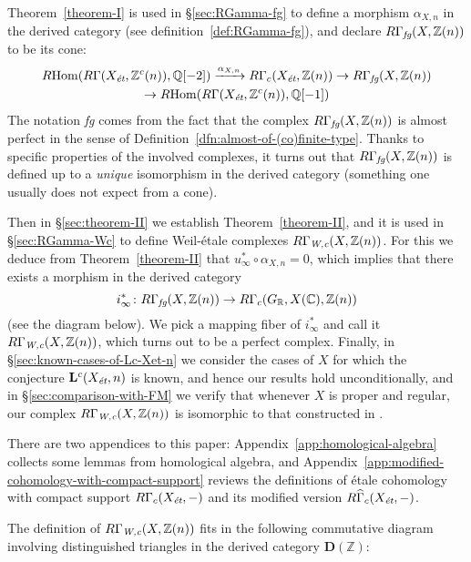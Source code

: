 \documentclass[draft,leqno,12pt]{article}
\theoremstyle{plain}
\theoremstyle{definition}
\DeclareMathOperator{\Hom}{Hom}
\newcommand{\ZZ}{\mathbb{Z}}
\newcommand{\QQ}{\mathbb{Q}}
\newcommand{\RR}{\mathbb{R}}
\newcommand{\CC}{\mathbb{C}}
\newcommand{\Wc}{\text{\it W,c}}
\newcommand{\et}{\text{\it \'{e}t}}
\newcommand{\fg}{\text{\it fg}}
\newcommand{\RHom}{R\!\Hom}
\begin{document}
Theorem~\ref{theorem-I} is used in \S\ref{sec:RGamma-fg} to define a morphism
$\alpha_{X,n}$ in the derived category (see definition~\ref{def:RGamma-fg}),
and declare $R\Gamma_\fg (X, \ZZ(n))$ to be its cone:
\begin{multline*}
  \RHom (R\Gamma (X_\et, \ZZ^c (n)), \QQ [-2]) \xrightarrow{\alpha_{X,n}}
  R\Gamma_c (X_\et, \ZZ (n)) \to
  R\Gamma_\fg (X, \ZZ(n)) \\
  \to \RHom (R\Gamma (X_\et, \ZZ^c (n)), \QQ [-1])
\end{multline*}
The notation \emph{fg} comes from the fact that the complex
$R\Gamma_\fg (X, \ZZ(n))$ is almost perfect in the sense of
Definition~\ref{dfn:almost-of-(co)finite-type}. Thanks to specific properties
of the involved complexes, it turns out that $R\Gamma_\fg (X, \ZZ(n))$ is
defined up to a \emph{unique} isomorphism in the derived category (something one
usually does not expect from a cone).

Then in \S\ref{sec:theorem-II} we establish Theorem~\ref{theorem-II}, and it is
used in \S\ref{sec:RGamma-Wc} to define Weil-\'{e}tale complexes
$R\Gamma_\Wc (X, \ZZ(n))$. For this we deduce from Theorem~\ref{theorem-II} that
$u_\infty^* \circ \alpha_{X,n} = 0$, which implies that there exists a morphism
in the derived category
$$i_\infty^*\colon R\Gamma_\fg (X, \ZZ (n)) \to R\Gamma_c (G_\RR, X (\CC), \ZZ(n))$$
(see the diagram below). We pick a mapping fiber of $i_\infty^*$ and call it
$R\Gamma_\Wc (X, \ZZ (n))$, which turns out to be a perfect complex.
Finally, in \S\ref{sec:known-cases-of-Lc-Xet-n} we consider the cases of $X$ for
which the conjecture $\mathbf{L}^c (X_\et, n)$ is known, and hence our results
hold unconditionally, and in \S\ref{sec:comparison-with-FM} we verify that
whenever $X$ is proper and regular, our complex $R\Gamma_\Wc (X, \ZZ (n))$ is
isomorphic to that constructed in \cite{Flach-Morin-2018}.

There are two appendices to this paper: Appendix~\ref{app:homological-algebra}
collects some lemmas from homological algebra, and
Appendix~\ref{app:modified-cohomology-with-compact-support} reviews the
definitions of \'{e}tale cohomology with compact support $R\Gamma_c (X_\et, -)$
and its modified version $R\widehat{\Gamma}_c (X_\et, -)$.

\vspace{1em}

The definition of $R\Gamma_\Wc (X,\ZZ(n))$ fits in the following commutative
diagram involving distinguished triangles in the derived category
$\mathbf{D} (\ZZ)$:
\end{document}
